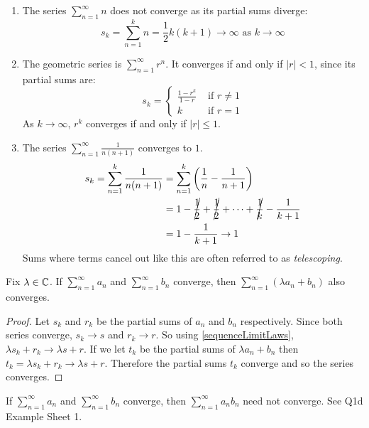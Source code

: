 \documentclass[../main.tex]{subfiles}
\begin{document}
\begin{example}
  \label{seriesConvExample}
  \begin{enumerate}
    \item The series $\sum\limits_{n = 1}^{\infty} n$ does not converge as its partial sums diverge:
      \[
        s_k = \sum_{n = 1}^{k} n = \frac{1}{2}k(k + 1) \to \infty \text{ as } k \to \infty
      \]
    \item The geometric series is $\sum\limits_{n = 1}^{\infty} r^{n}$.
      It converges if and only if $|r| < 1$, since its partial sums are:
      \[
        s_k = \begin{cases}
        \frac{1 - r^{k}}{1 - r} & \text{ if } r\neq1 \\
        k & \text{ if } r = 1
        \end{cases}
      \]
      As $k \to \infty$, $r^{k}$ converges if and only if $|r| \leq 1$.
    \item The series $\sum\limits_{n = 1}^{\infty} \frac{1}{n(n + 1)}$ converges to $1$.
      \begin{align*}
        s_k = \sum_{n = 1}^{k} \frac{1}{n(n + 1)} &= \sum_{n = 1}^{k} \left(\frac{1}{n} - \frac{1}{n + 1}\right) \\
                                                  &= 1 - \cancel{\frac{1}{2}} + \cancel{\frac{1}{2}} + \cdots + \cancel{\frac{1}{k}} - \frac{1}{k + 1} \\
                                                  &= 1 - \frac{1}{k + 1} \to 1
      \end{align*}
      Sums where terms cancel out like this are often referred to as \textit{telescoping}.
  \end{enumerate}
\end{example}
\begin{lemma}
  Fix $\lambda \in \mathbb{C}$.
  If $\sum_{n = 1}^{\infty} a_n$ and $\sum_{n = 1}^{\infty} b_n$ converge, then $\sum_{n = 1}^{\infty} (\lambda a_n + b_n)$ also converges.
\end{lemma}
\begin{proof}
  Let $s_k$ and $r_k$ be the partial sums of $a_n$ and $b_n$ respectively.
  Since both series converge, $s_k \to s$ and $r_k \to r$.
  So using \cref{sequenceLimitLaws}, $\lambda s_k + r_k \to \lambda s + r$.
  If we let $t_k$ be the partial sums of $\lambda a_n + b_n$ then $t_k = \lambda s_k + r_k \to \lambda s + r$.
  Therefore the partial sums $t_k$ converge and so the series converges.
\end{proof}
\begin{remark}
  If $\sum_{n = 1}^{\infty} a_n$ and $\sum_{n = 1}^{\infty} b_n$ converge, then $\sum_{n = 1}^{\infty} a_n b_n$ need not converge.
  See Q1d Example Sheet 1.
\end{remark}
\end{document}
